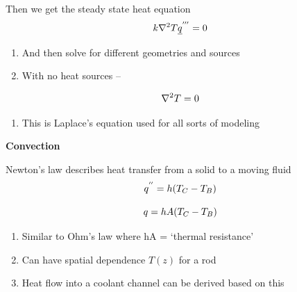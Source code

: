 \documentclass[aspectratio=1610,pdftex,dvipsnames,compress,xcolor={dvipsnames}]{beamer}
\begin{document}
\begin{frame}{Then we get the steady state heat equation}
    \begin{equation}
        \LARGE
        k \nabla^2 T \underline{q}^{'''} = 0
    \end{equation}

    \vspace*{\fill}

    \begin{enumerate}[series=outerlist,topsep=0pt,itemsep=21pt,leftmargin=*,label=(\arabic*)]
        \item[]And then solve for different geometries and sources
        \item[]With no heat sources --
    \end{enumerate}

    \vspace*{\fill}

    \begin{equation}
        \LARGE
        \nabla^2 T = 0
    \end{equation}

    \vspace*{\fill}

    \begin{enumerate}[series=outerlist,topsep=0pt,itemsep=21pt,leftmargin=*,label=(\arabic*)]
        \item[]This is Laplace's equation used for all sorts of modeling
    \end{enumerate}
\end{frame}


\begin{frame}[plain]{}
    \centering\LARGE\textbf{Convection}
\end{frame}


\addtocounter{framenumber}{-1} 
\begin{frame}{Newton's law describes heat transfer from a solid to a moving fluid}
    \begin{equation}
        \LARGE
        q^{''} = h(T_C-T_B)
    \end{equation}

    \begin{equation}
        \LARGE
        q = hA(T_C-T_B)
    \end{equation}

    \vspace*{\fill}

    \begin{enumerate}[series=outerlist,topsep=0pt,itemsep=21pt,leftmargin=*,label=(\arabic*)]
        \item[]Similar to Ohm's law where hA = `thermal resistance'
        \item[]Can have spatial dependence $T(z)$ for a rod
        \item[]Heat flow into a coolant channel can be derived based on this
    \end{enumerate}
\end{frame}
\end{document}
